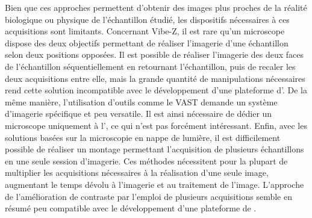 \documentclass[\main/main.tex]{subfiles}
\begin{document}
%
Bien que ces approches permettent d'obtenir des images plus proches de la réalité biologique ou physique de l'échantillon étudié, les dispositifs nécessaires à ces acquisitions sont limitants.
%
Concernant Vibe-Z, il est rare qu'un microscope dispose des deux objectifs permettant de réaliser l'imagerie d'une échantillon selon deux positions opposées.
%
Il est possible de réaliser l'imagerie des deux faces de l'échantillon séquentiellement en retournant l'échantillon, puis de recaler les deux acquisitions entre elle, mais la grande quantité de manipulations nécessaires rend cette solution incompatible avec le développement d'une plateforme d'\hti{}.
%
De la même manière, l'utilisation d'outils comme le VAST demande un système d'imagerie spécifique et peu versatile. Il est ainsi nécessaire de dédier un microscope uniquement à l'\hti{}, ce qui n'est pas forcément intéressant.
%
Enfin, avec les solutions basées sur la microscopie en nappe de lumière, il est difficilement possible de réaliser un montage permettant l'acquisition de plusieurs échantillons en une seule session d'imagerie.
%
Ces méthodes nécessitent pour la plupart de multiplier les acquisitions nécessaires à la réalisation d'une seule image, augmentant le temps dévolu à l'imagerie et au traitement de l'image.
%
L'approche de l'amélioration de contraste par l'emploi de plusieurs acquisitions semble en résumé peu compatible avec le développement d'une plateforme de \hcs{}.
\end{document}
